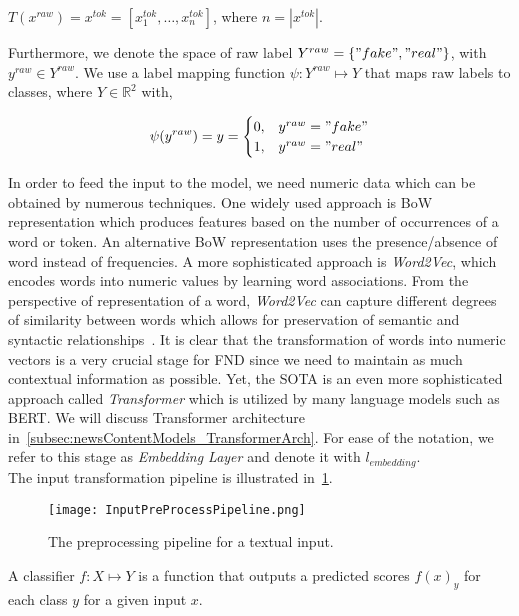 \begin{center}
    $T(x^{raw}) = x^{tok} = [x_1^{tok}, \dots, x_n^{tok}]$, where $n = |x^{tok}|$.
\end{center}
Furthermore, we denote the space of raw label $Y^{raw} = \{"fake", "real"\}$, with
$y^{raw} \in Y^{raw}$. We use a label mapping function $\psi: Y^{raw} \mapsto Y$ that maps raw labels to classes, where $Y \in \mathbb{R}^2$ with,
\begin{center}
    \[\psi(y^{raw}) = y =
        \begin{cases}
            0, & y^{raw} = "fake" \\
            1, & y^{raw} = "real"
        \end{cases}
    \]
\end{center}
In order to feed the input to the model, we need numeric data which can be obtained by numerous techniques. One widely used approach is BoW representation which produces features based on the number of occurrences of a word or token. An alternative BoW representation uses the presence/absence of word instead of frequencies. A more sophisticated approach is \emph{Word2Vec}, which encodes words into numeric values by learning word associations. From the perspective of representation of a word, \emph{Word2Vec} can capture different degrees of similarity between words which allows for preservation of semantic and syntactic relationships~\parencite{Word2Vec_Mikolov}. It is clear that the transformation of words into numeric vectors is a very crucial stage for FND since we need to maintain as much contextual information as possible. Yet, the SOTA is an even more sophisticated approach called \emph{Transformer} which is utilized by many language models such as BERT. We will discuss Transformer architecture in~\ref{subsec:newsContentModels_TransformerArch}. For ease of the notation, we refer to this stage as \emph{Embedding Layer} and denote it with $l_{embedding}$.\\
The input transformation pipeline is illustrated in~\ref{fig:InputPreProcessPipeline}.
\begin{figure}
    \texttt{[image: InputPreProcessPipeline.png]}
    \caption[The preprocessing pipeline for a textual input.]{The preprocessing pipeline for a textual input.}
    \label{fig:InputPreProcessPipeline}
\end{figure}
\begin{definition}
    A classifier $f:X \mapsto Y$ is a function that outputs a predicted scores $f(x)_y$ for each class $y$ for a given input $x$.
\end{definition}
